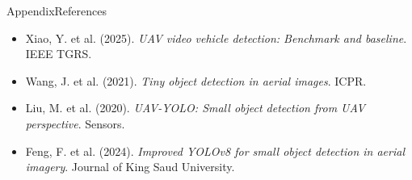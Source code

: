 \documentclass[10pt]{beamer}
\begin{document}
	\begin{frame}{Appendix}{References}
		
		\footnotesize
		
		\begin{itemize}
			
			\item Xiao, Y. et al. (2025). \textit{UAV video vehicle detection: Benchmark and baseline}. IEEE TGRS.
			
			\item Wang, J. et al. (2021). \textit{Tiny object detection in aerial images}. ICPR.
			
			\item Liu, M. et al. (2020). \textit{UAV-YOLO: Small object detection from UAV perspective}. Sensors.
			
			\item Feng, F. et al. (2024). \textit{Improved YOLOv8 for small object detection in aerial imagery}. Journal of King Saud University.
			
		\end{itemize}
		
	\end{frame}
	
	
\end{document}
